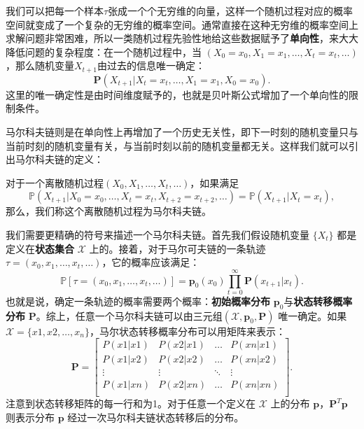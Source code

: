 我们可以把每一个样本$\tau$张成一个个无穷维的向量，这样一个随机过程对应的概率空间就变成了一个复杂的无穷维的概率空间。通常直接在这种无穷维的概率空间上求解问题非常困难，所以一类随机过程先验性地给这些数据赋予了\textbf{单向性}，来大大降低问题的复杂程度：在一个随机过程中，当 $(X_0 = x_0, X_1 = x_1, \ldots, X_t = x_t, \ldots)$，那么随机变量$X_{t+1}$由过去的信息唯一确定：
\begin{equation}
    \mathbf{P}(X_{t+1} \vert X_{t} = x_t, \ldots, X_1 = x_1, X_0 = x_0).
\end{equation}
这里的唯一确定性是由时间维度赋予的，也就是贝叶斯公式增加了一个单向性的限制条件。

马尔科夫链则是在单向性上再增加了一个历史无关性，即下一时刻的随机变量只与当前时刻的随机变量有关，与当前时刻以前的随机变量都无关。这样我们就可以引出马尔科夫链的定义：
\begin{definition}[马尔科夫链]
    对于一个离散随机过程$(X_0, X_1, \ldots, X_t, \ldots)$，如果满足
    \begin{equation}
        \mathbb{P}(X_{t+1} \vert X_0 = x_0,\ldots,X_t = x_t, X_{t+2} = x_{t+2}, \ldots)
        = \mathbb{P}(X_{t+1} \vert X_t = x_t),
    \end{equation}
    那么，我们称这个离散随机过程为马尔科夫链。
\end{definition}

我们需要更精确的符号来描述一个马尔科夫链。首先我们假设随机变量 $\{X_t\}$ 都是定义在\textbf{状态集合} $\mathcal{X}$ 上的。接着，对于马尔可夫链的一条轨迹$\tau=(x_0, x_1, \ldots, x_t, \ldots)$，它的概率应该满足：
\begin{equation}
    \mathbb{P}[\tau= (x_0, x_1, \ldots, x_t, \ldots)] = 
    \mathbf{p}_0(x_0) \prod^\infty_{t=0} \mathbf{P}(x_{t+1} \vert x_t).
\end{equation}
也就是说，确定一条轨迹的概率需要两个概率：\textbf{初始概率分布} $\mathbf{p}_0$与\textbf{状态转移概率分布} $\mathbf{P}$。综上，任意一个马尔科夫链可以由三元组$(\mathcal{X}, \mathbf{p}_0, \mathbf{P})$ 唯一确定。如果 $\mathcal{X} = \{x1, x2, \ldots, x_n\}$，马尔状态转移概率分布可以用矩阵来表示：
\begin{equation}
    \mathbf{P} = 
    \begin{bmatrix}
        P(x1 \vert x1) & P(x2 \vert x1) & \ldots & P(xn \vert x1) \\
        P(x1 \vert x2) & P(x2 \vert x2) & \ldots & P(xn \vert x2) \\
        \vdots & \vdots & \ddots & \vdots \\
        P(x1 \vert xn) & P(x2 \vert xn) & \ldots & P(xn \vert xn) \\
    \end{bmatrix}.
\end{equation}
注意到状态转移矩阵的每一行和为1。对于任意一个定义在 $\mathcal{X}$ 上的分布 $\mathbf{p}$，$\mathbf{P}^T\mathbf{p}$ 则表示分布 $\mathbf{p}$ 经过一次马尔科夫链状态转移后的分布。 

